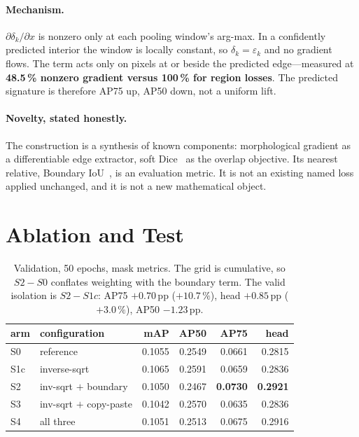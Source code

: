 \documentclass[11pt,letterpaper]{article}
\begin{document}
\paragraph{Mechanism.}
$\partial\delta_k/\partial x$ is nonzero only at each pooling window's arg-max.
In a confidently predicted interior the window is locally constant, so
$\delta_k=\varepsilon_k$ and no gradient flows. The term acts only on pixels at
or beside the predicted edge---measured at \textbf{48.5\,\% nonzero gradient
versus 100\,\% for region losses}. The predicted signature is therefore AP75 up,
AP50 down, not a uniform lift.

\paragraph{Novelty, stated honestly.}
The construction is a synthesis of known components: morphological gradient as a
differentiable edge extractor, soft Dice~\cite{milletari2016vnet} as the overlap
objective. Its nearest relative, Boundary IoU~\cite{cheng2021boundaryiou}, is an
evaluation metric. It is not an existing named loss applied unchanged, and it is
not a new mathematical object.

\section{Ablation and Test}

\begin{table}[h]
\centering\small
\begin{tabular}{llrrrr}
\toprule
arm & configuration & mAP & AP50 & AP75 & head \\
\midrule
S0 & reference & 0.1055 & 0.2549 & 0.0661 & 0.2815 \\
S1c & inverse-sqrt & 0.1065 & 0.2591 & 0.0659 & 0.2836 \\
S2 & inv-sqrt $+$ boundary & 0.1050 & 0.2467 & \textbf{0.0730} & \textbf{0.2921} \\
S3 & inv-sqrt $+$ copy-paste & 0.1042 & 0.2570 & 0.0635 & 0.2836 \\
S4 & all three & 0.1051 & 0.2513 & 0.0675 & 0.2916 \\
\bottomrule
\end{tabular}
\caption{Validation, 50 epochs, mask metrics. The grid is cumulative, so
$S2-S0$ conflates weighting with the boundary term. The valid isolation is
$S2-S1c$: AP75 $+0.70$\,pp ($+10.7\,\%$), head $+0.85$\,pp ($+3.0\,\%$),
AP50 $-1.23$\,pp.}
\end{table}
\end{document}
